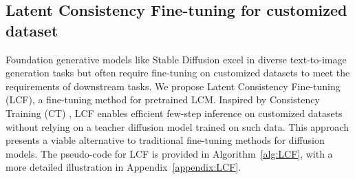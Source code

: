 \documentclass{article} %
\newcommand{\lsm}[1]{\textcolor{purple}{#1}}
\begin{document}
\subsection{Latent Consistency Fine-tuning for customized dataset \label{sec:consitency_finetune}}
\vspace{-8pt}

Foundation generative models like Stable Diffusion excel in diverse text-to-image generation tasks but often require fine-tuning on customized datasets to meet the requirements of downstream tasks. We propose Latent Consistency Fine-tuning (LCF), a fine-tuning method for pretrained LCM. Inspired by Consistency Training (CT) \citep{song2023consistency}, LCF enables efficient few-step inference on customized datasets without relying on a teacher diffusion model trained on such data. This approach presents a viable alternative to traditional fine-tuning methods for diffusion models. 
The pseudo-code for LCF is provided in Algorithm~\ref{alg:LCF}, with a more detailed illustration in Appendix~\ref{appendix:LCF}.










\end{document}
